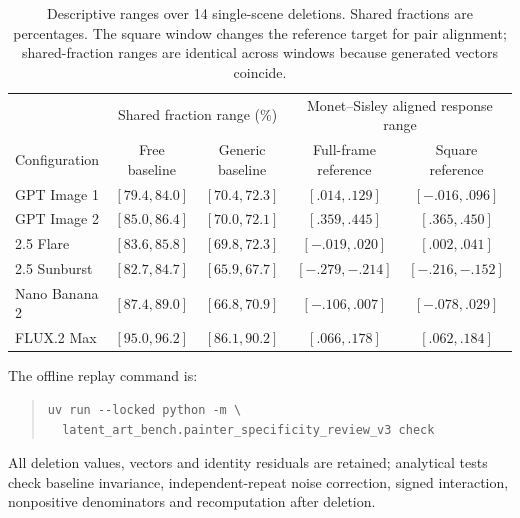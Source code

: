 \begin{table}[htbp]
\caption{Descriptive ranges over 14 single-scene deletions. Shared fractions are percentages.
The square window changes the reference target for pair alignment; shared-fraction
ranges are identical across windows because generated vectors coincide.}
\label{tab:direct-naming-deletions}
\centering\small
\begin{tabular}{@{}lcccc@{}}\toprule
& \multicolumn{2}{c}{Shared fraction range (\%)} & \multicolumn{2}{c}{Monet--Sisley aligned response range}\\
Configuration & Free baseline & Generic baseline & Full-frame reference & Square reference\\\midrule
GPT Image 1 & $[79.4,84.0]$ & $[70.4,72.3]$ & $[.014,.129]$ & $[-.016,.096]$\\
GPT Image 2 & $[85.0,86.4]$ & $[70.0,72.1]$ & $[.359,.445]$ & $[.365,.450]$\\
2.5 Flare & $[83.6,85.8]$ & $[69.8,72.3]$ & $[-.019,.020]$ & $[.002,.041]$\\
2.5 Sunburst & $[82.7,84.7]$ & $[65.9,67.7]$ & $[-.279,-.214]$ & $[-.216,-.152]$\\
Nano Banana 2 & $[87.4,89.0]$ & $[66.8,70.9]$ & $[-.106,.007]$ & $[-.078,.029]$\\
FLUX.2 Max & $[95.0,96.2]$ & $[86.1,90.2]$ & $[.066,.178]$ & $[.062,.184]$\\
\bottomrule\end{tabular}
\end{table}

The offline replay command is:
\begin{quote}\small
\begin{verbatim}
uv run --locked python -m \
  latent_art_bench.painter_specificity_review_v3 check
\end{verbatim}
\end{quote}
All deletion values, vectors and identity residuals are retained; analytical
tests check baseline invariance, independent-repeat noise correction, signed
interaction, nonpositive denominators and recomputation after deletion.
